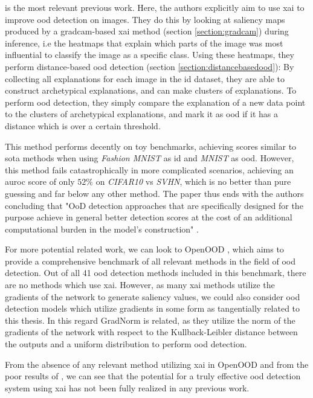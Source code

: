 \documentclass[UKenglish]{uiomasterthesis} %
\theoremstyle{definition}
\begin{document}
\cite{martinez} is the most relevant previous work. Here, the authors explicitly aim to use \ac{xai} to improve \ac{ood} detection on images. They do this by looking at saliency maps produced by a \ac{gradcam}-based \ac{xai} method (section \ref{section:gradcam}) during inference, i.e the heatmaps that explain which parts of the image was most influential to classify the image as a specific class. Using these heatmaps, they perform distance-based \ac{ood} detection (section \ref{section:distancebasedood}): By collecting all explanations for each image in the \ac{id} dataset, they are able to construct archetypical explanations, and can make clusters of explanations. To perform \ac{ood} detection, they simply compare the explanation of a new data point to the clusters of archetypical explanations, and mark it as \ac{ood} if it has a distance which is over a certain threshold.

This method performs decently on toy benchmarks, achieving scores similar to \ac{sota} methods when using {\it Fashion MNIST} as \ac{id} and {\it MNIST} as \ac{ood}. However, this method fails catastrophically in more complicated scenarios, achieving an \ac{auroc} score of only $52\%$ on {\it CIFAR10} vs {\it SVHN}, which is no better than pure guessing and far below any other method. The paper thus ends with the authors concluding that "OoD detection approaches that are specifically designed for the purpose achieve in general better detection scores at the cost of an additional computational burden in the model’s construction" \cite{martinez}.

For more potential related work, we can look to OpenOOD \cite{openood, openood15}, which aims to provide a comprehensive benchmark of all relevant methods in the field of \ac{ood} detection. Out of all 41 \ac{ood} detection methods included in this benchmark, there are no methods which use \ac{xai}. However, as many \ac{xai} methods utilize the gradients of the network to generate saliency values, we could also consider \ac{ood} detection models which utilize gradients in some form as tangentially related to this thesis. In this regard GradNorm \cite{gradnorm} is related, as they utilize the norm of the gradients of the network with respect to the Kullback-Leibler distance between the outputs and a uniform distribution to perform \ac{ood} detection.

From the absence of any relevant method utilizing \ac{xai} in OpenOOD and from the poor results of \cite{martinez}, we can see that the potential for a truly effective \ac{ood} detection system using \ac{xai} has not been fully realized in any previous work.
\end{document}
